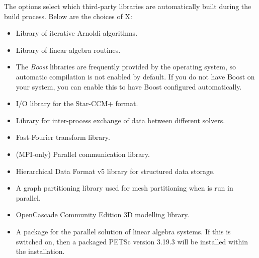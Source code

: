 The  options select which third-party libraries are
automatically built during the \nekpp build process. Below are the choices of X:
\begin{itemize}
    \item {}

    Library of iterative Arnoldi algorithms.

    \item {}

    Library of linear algebra routines.

    \item {}

    The \emph{Boost} libraries are frequently provided by the operating system,
    so automatic compilation is not enabled by default. If you do not have
    Boost on your system, you can enable this to have Boost configured
    automatically.

    \item {}

    I/O library for the Star-CCM+ format.

    \item {}

    Library for inter-process exchange of data between different solvers.

    \item {}

    Fast-Fourier transform library.

    \item {}

    (MPI-only) Parallel communication library.

    \item {}

    Hierarchical Data Format v5 library for structured data storage.

    \item {}

    A graph partitioning library used for mesh partitioning when \nekpp is run
    in parallel.

    \item {}

    OpenCascade Community Edition 3D modelling library.

    \item {}

    A package for the parallel solution of linear algebra systems. If this is switched on, then a packaged PETSc version 3.19.3 will be installed within the \nekpp installation.


\end{itemize}
